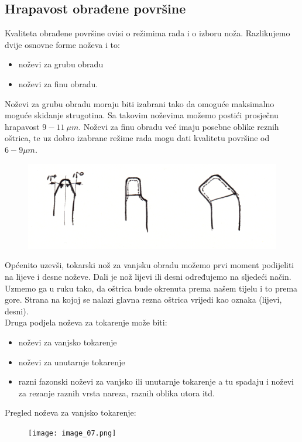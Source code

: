 \documentclass[a4paper,12pt]{article}
\numberwithin{figure}{section}
\begin{document}
\subsection{Hrapavost obrađene površine}
Kvaliteta obrađene površine ovisi o režimima rada i o izboru noža. Razlikujemo dvije osnovne forme noževa i to:
\begin{itemize}
\item noževi za grubu obradu
\item noževi za finu obradu.
\end{itemize}
Noževi za grubu obradu moraju biti izabrani tako da omoguće maksimalno moguće skidanje strugotina. Sa takovim noževima možemo postići prosječnu hrapavost  $9 - 11\:\mu m$. Noževi za finu obradu već imaju posebne oblike reznih oštrica, te uz dobro izabrane režime rada mogu dati kvalitetu površine od $6-9 \mu m$.
\begin{figure}[!h]
\includegraphics[width=\textwidth]{image_06-2.png}
\end{figure}
\FloatBarrier
Općenito uzevši, tokarski nož za vanjsku obradu možemo prvi moment podijeliti na lijeve i desne noževe. Dali je nož lijevi ili desni određujemo na sljedeći način. Uzmemo ga u ruku tako, da oštrica bude okrenuta prema našem tijelu i to prema gore. Strana na kojoj se nalazi glavna rezna oštrica vrijedi kao oznaka (lijevi, desni).\\
Druga podjela noževa za tokarenje može biti:
\begin{itemize}
\item noževi za vanjsko tokarenje
\item noževi za unutarnje tokarenje
\item razni fazonski noževi za vanjsko ili unutarnje tokarenje a tu spadaju i noževi za rezanje raznih vrsta nareza, raznih oblika utora itd.
\end{itemize}
Pregled noževa za vanjsko tokarenje:
\begin{figure}[!h]
\texttt{[image: image\_07.png]}
\end{figure}
\FloatBarrier
\end{document}
